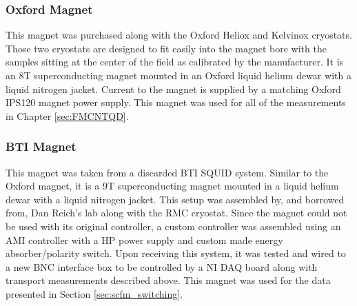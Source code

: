 \subsubsection*{Oxford Magnet}

This magnet was purchased along with the Oxford Heliox and Kelvinox cryostats. Those two cryostats are designed to fit easily into the magnet bore with the samples sitting at the center of the field as calibrated by the manufacturer. It is an 8T superconducting magnet mounted in an Oxford liquid helium dewar with a liquid nitrogen jacket. Current to the magnet is supplied by a matching Oxford IPS120 magnet power supply. This magnet was used for all of the measurements in Chapter \ref{sec:FMCNTQD}.

\subsubsection*{BTI Magnet}

This magnet was taken from a discarded BTI SQUID system. Similar to the Oxford magnet, it is a 9T superconducting magnet mounted in a liquid helium dewar with a liquid nitrogen jacket. This setup was assembled by, and borrowed from, Dan Reich's lab along with the RMC cryostat. Since the magnet could not be used with its original controller, a custom controller was assembled using an AMI controller with a HP power supply and custom made energy absorber/polarity switch. Upon receiving this system, it was tested and wired to a new BNC interface box to be controlled by a NI DAQ board along with transport measurements described above. This magnet was used for the data presented in Section \ref{sec:scfm_switching}.